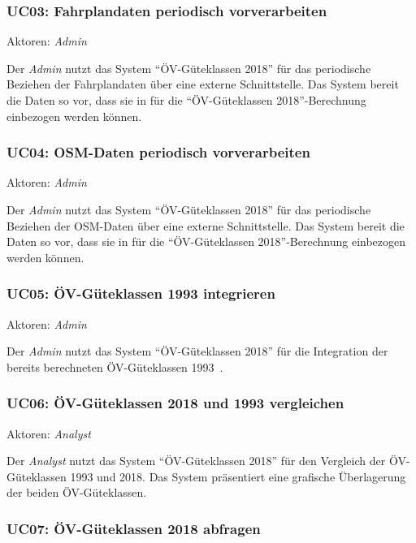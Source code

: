 \subsubsection{UC03: Fahrplandaten periodisch vorverarbeiten}
\label{Use Cases:UC03}

Aktoren: \emph{Admin}

Der \emph{Admin} nutzt das System "`\acs{ÖV}-Güteklassen 2018"' für das periodische Beziehen der Fahrplandaten über eine externe Schnittstelle.
Das System bereit die Daten so vor, dass sie in  für die "`\acs{ÖV}-Güteklassen 2018"'-Berechnung einbezogen werden können.

\subsubsection{UC04: OSM-Daten periodisch vorverarbeiten}
\label{Use Cases:UC04}

Aktoren: \emph{Admin}

Der \emph{Admin} nutzt das System "`\acs{ÖV}-Güteklassen 2018"' für das periodische Beziehen der \acs{OSM}-Daten über eine externe Schnittstelle.
Das System bereit die Daten so vor, dass sie in  für die "`\acs{ÖV}-Güteklassen 2018"'-Berechnung einbezogen werden können.


\subsubsection{UC05: ÖV-Güteklassen 1993 integrieren}
\label{Use Cases:UC05}

Aktoren: \emph{Admin}

Der \emph{Admin} nutzt das System "`\acs{ÖV}-Güteklassen 2018"' für die Integration der bereits berechneten ÖV-Güteklassen 1993~\cite{berechnung_are}.


\subsubsection{UC06: ÖV-Güteklassen 2018 und 1993 vergleichen}
\label{Use Cases:UC06}

Aktoren: \emph{Analyst}

Der \emph{Analyst} nutzt das System "`\acs{ÖV}-Güteklassen 2018"' für den Vergleich der \acs{ÖV}-Güteklassen 1993 und 2018.
Das System präsentiert eine grafische Überlagerung der beiden \acs{ÖV}-Güteklassen.

\subsubsection{UC07: ÖV-Güteklassen 2018 abfragen}
\label{Use Cases:UC07}

